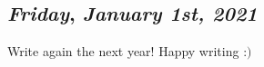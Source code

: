 \begin{center}
\section*{\month}
\end{center}

\def\day{\textit{January 1st, 2021}}
\def\weekday{\textit{Friday}}
\subsection*{\weekday, \day}
Write again the next year! Happy writing :$)$